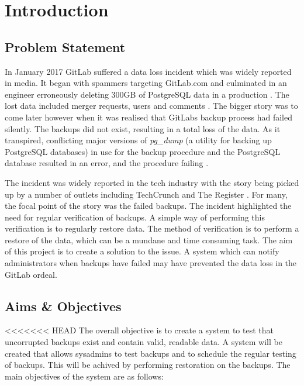 \section{Introduction}

\subsection{Problem Statement}
In January 2017 GitLab suffered a data loss incident which was widely reported in media. It began with spammers targeting GitLab.com and culminated in an engineer erroneously deleting 300GB of PostgreSQL data in a production . The lost data included merger requests, users and comments \citep{gitlab1}. The bigger story was to come later however when it was realised that GitLabs backup process had failed silently. The backups did not exist, resulting in a total loss of the data. As it transpired, conflicting major versions of \textit{pg\_dump} (a utility for backing up PostgreSQL databases) in use for the backup procedure and the PostgreSQL database resulted in an error, and the procedure failing \citep{gitlab2}.

The incident was widely reported in the tech industry with the story being picked up by a number of outlets including TechCrunch \citeyearpar{lomas} and The Register \citeyearpar{sharwood}. For many, the focal point of the story was the failed backups. The incident highlighted the need for regular verification of backups. A simple way of performing this verification is to regularly restore data. The method of verification is to perform a restore of the data, which can be a mundane and time consuming task. The aim of this project is to create a solution to the issue. A system which can notify administrators when backups have failed may have prevented the data loss in the GitLab ordeal.

\subsection{Aims \& Objectives}
<<<<<<< HEAD
The overall objective is to create a system to test that uncorrupted backups exist and contain valid, readable data. A system will be created that allows sysadmins to test backups and to schedule the regular testing of backups. This will be achived by performing restoration on the backups. The main objectives of the system are as follows:

